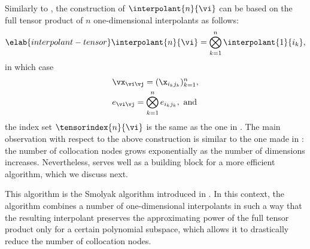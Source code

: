 Similarly to , the construction of
$\interpolant{n}{\vi}$ can be based on the full tensor product of $n$
one-dimensional interpolants as follows:
\begin{equation} \elab{interpolant-tensor}
  \interpolant{n}{\vi} = \bigotimes_{k = 1}^n \interpolant{1}{i_k},
\end{equation}
in which case
\begin{align*}
  & \vx_{\vi \vj} = (\x_{i_k j_k})_{k = 1}^n, \\
  & e_{\vi \vj} = \bigotimes_{k = 1}^n e_{i_k j_k}, \text{ and}
\end{align*}
the index set $\tensorindex{n}{\vi}$ is the same as the one in
. The main observation with respect to the above
construction is similar to the one made in : the
number of collocation nodes grows exponentially as the number of dimensions
increases. Nevertheless,  serves well as a building
block for a more efficient algorithm, which we discuss next.

This algorithm is the Smolyak algorithm introduced in
. In this context, the algorithm combines a number
of one-dimensional interpolants in such a way that the resulting interpolant
preserves the approximating power of the full tensor product only for a certain
polynomial subspace, which allows it to drastically reduce the number of
collocation nodes.

